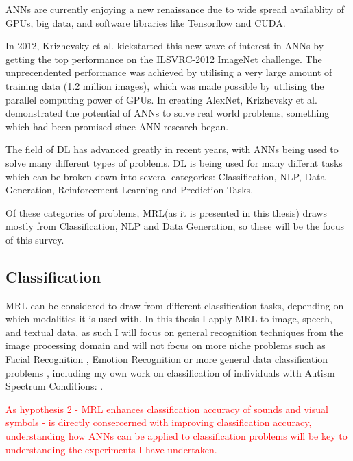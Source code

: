 \acp{ANN} are currently enjoying a new renaissance due to wide spread availablity of \acp{GPU}, big data, and software libraries like Tensorflow and CUDA.

In 2012, Krizhevsky et al. \cite{krizhevsky2012imagenet} kickstarted this new wave of interest in \acp{ANN} by getting the top performance on the ILSVRC-2012 ImageNet challenge. The unprecendented performance was achieved by utilising a very large amount of training data (1.2 million images), which was made possible by utilising the parallel computing power of \acp{GPU}. In creating AlexNet, Krizhevsky et al. demonstrated the potential of \acp{ANN} to solve real world problems, something which had been promised since \ac{ANN} research began.

The field of \ac{DL} has advanced greatly in recent years, with \acp{ANN} being used to solve many different types of problems. \ac{DL} is being used for many differnt tasks which can be broken down into several categories: Classification, \ac{NLP}, Data Generation, Reinforcement Learning \cite{vinyals2019alphastar} and Prediction Tasks.


Of these categories of problems, \ac{MRL}(as it is presented in this thesis) draws mostly from Classification, \ac{NLP} and Data Generation, so these will be the focus of this survey.

\subsection{Classification}
\ac{MRL} can be considered to draw from different classification tasks, depending on which modalities it is used with. In this thesis I apply \ac{MRL} to image, speech, and textual data, as such I will focus on general recognition techniques from the image processing domain and will not focus on more niche problems such as Facial Recognition \cite{ma2004facial}, Emotion Recognition \cite{levi2015emotion} or more general data classification problems \cite{kussul2017deep,qi2017pointnet}, including my own work on classification of individuals with Autism Spectrum Conditions: \cite{lohan2016distinguishing, sheppard2017understanding, lohan2018toward}.

\textcolor{red}{As hypothesis 2 - \ac{MRL} enhances classification accuracy of sounds and visual symbols - is directly consercerned with improving classification accuracy, understanding how \acp{ANN} can be applied to classification problems will be key to understanding the experiments I have undertaken.}

